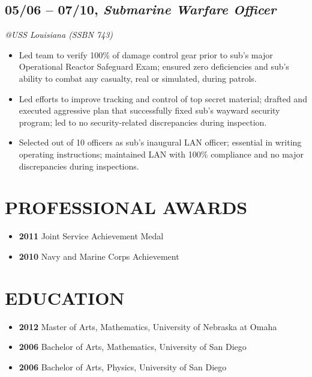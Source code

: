 \documentclass[10pt]{article}
\begin{document}
\subsection{\texorpdfstring{05/06 -- 07/10, \textbf{\emph{Submarine
Warfare
Officer}}}{05/06 -- 07/10, Submarine Warfare Officer}}\label{submarine-warfare-officer}

\emph{@USS Louisiana (SSBN 743)}

\begin{itemize}
\itemsep1pt\parskip0pt
\item
  Led team to verify 100\% of damage control gear prior to sub's major
  Operational Reactor Safeguard Exam; ensured zero deficiencies and
  sub's ability to combat any casualty, real or simulated, during
  patrols.
\item
  Led efforts to improve tracking and control of top secret material;
  drafted and executed aggressive plan that successfully fixed sub's
  wayward security program; led to no security-related discrepancies
  during inspection.
\item
  Selected out of 10 officers as sub's inaugural LAN officer; essential
  in writing operating instructions; maintained LAN with 100\%
  compliance and no major discrepancies during inspections.
\end{itemize}

\section{PROFESSIONAL AWARDS}\label{professional-awards}

\begin{itemize}
\itemsep1pt\parskip0pt
\item
  \textbf{2011} Joint Service Achievement Medal
\item
  \textbf{2010} Navy and Marine Corps Achievement
\end{itemize}

\section{EDUCATION}\label{education}

\begin{itemize}
\itemsep1pt\parskip0pt
\item
  \textbf{2012} Master of Arts, Mathematics, University of Nebraska at
  Omaha
\item
  \textbf{2006} Bachelor of Arts, Mathematics, University of San Diego
\item
  \textbf{2006} Bachelor of Arts, Physics, University of San Diego
\end{itemize}
\end{document}
